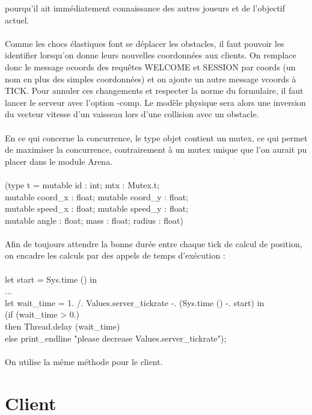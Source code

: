 \documentclass{article}
\begin{document}
pourqu'il ait immédiatement connaissance des autres joueurs et de l'objectif actuel.\\
\\
Comme les chocs élastiques font se déplacer les obstacles, il faut pouvoir les identifier lorsqu'on donne leurs nouvelles coordonnées aux clients.
On remplace donc le message ocoords des requêtes WELCOME et SESSION par coords (un nom en plus des simples coordonnées) et on ajoute un autre message
vcoords à TICK. Pour annuler ces changements et respecter la norme du formulaire, il faut lancer le serveur avec l'option -comp.
Le modèle physique sera alors une inversion du vecteur vitesse d'un vaisseau lors d'une collision avec un obstacle.\\
\\
En ce qui concerne la concurrence, le type objet contient un mutex, ce qui permet de maximiser la concurrence,
contrairement à un mutex unique que l'on aurait pu placer dans le module Arena.\\
\\
(type t = {mutable id : int; mtx : Mutex.t;\\
          mutable coord\_x : float; mutable coord\_y : float;\\
          mutable speed\_x : float; mutable speed\_y : float;\\
          mutable angle : float; mass : float; radius : float})\\
\\
Afin de toujours attendre la bonne durée entre chaque tick de calcul de position, on encadre les calculs
par des appels de temps d'exécution :\\
\\
let start = Sys.time () in\\
...\\
let wait\_time = 1. /. Values.server\_tickrate -. (Sys.time () -. start) in\\
(if (wait\_time > 0.)\\
  then Thread.delay (wait\_time)\\
  else print\_endline "please decrease Values.server\_tickrate");\\
\\
On utilise la même méthode pour le client.

\section{Client}
\end{document}
